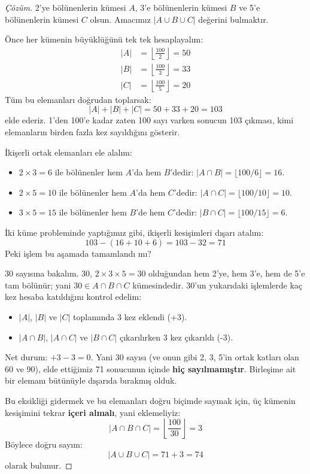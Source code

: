 \begin{proof}[Çözüm]
2'ye bölünenlerin kümesi $A$, 3'e bölünenlerin kümesi $B$ ve 5'e bölünenlerin kümesi
$C$ olsun. Amacımız $|A \cup B \cup C|$ değerini bulmaktır.

Önce her kümenin büyüklüğünü tek tek hesaplayalım: \begin{align*} |A| &=
\left\lfloor \frac{100}{2} \right\rfloor = 50 \\ |B| &= \left\lfloor
\frac{100}{3} \right\rfloor = 33 \\ |C| &= \left\lfloor \frac{100}{5}
\right\rfloor = 20 \end{align*} Tüm bu elemanları doğrudan toplarsak: \[ |A| +
|B| + |C| = 50 + 33 + 20 = 103 \] elde ederiz. 1'den 100'e kadar zaten 100 sayı
varken sonucun 103 çıkması, kimi elemanların birden fazla kez sayıldığını gösterir.

İkişerli ortak elemanları ele alalım: \begin{itemize} \item $2 \times 3 = 6$ ile
bölünenler hem $A$'da hem $B$'dedir: $|A \cap B| = \lfloor 100/6 \rfloor = 16$. \item
$2 \times 5 = 10$ ile bölünenler hem $A$'da hem $C$'dedir:
$|A \cap C| = \lfloor 100/10 \rfloor = 10$. \item $3 \times 5 = 15$ ile bölünenler
hem $B$'de hem $C$'dedir: $|B \cap C| = \lfloor 100/15 \rfloor = 6$. \end{itemize} İki
küme probleminde yaptığımız gibi, ikişerli kesişimleri dışarı atalım: \[ 103 -
(16 + 10 + 6) = 103 - 32 = 71 \] Peki işlem bu aşamada tamamlandı mı?

30 sayısına bakalım. 30, $2 \times 3 \times 5 = 30$ olduğundan hem 2'ye, hem
3'e, hem de 5'e tam bölünür; yani $30 \in A \cap B \cap C$ kümesindedir. 30'un
yukarıdaki işlemlerde kaç kez hesaba katıldığını kontrol edelim:
\begin{itemize} \item $|A|$, $|B|$ ve $|C|$ toplamında 3 kez eklendi (+3). \item
$|A \cap B|$, $|A \cap C|$ ve $|B \cap C|$ çıkarılırken 3 kez çıkarıldı (-3).
\end{itemize} Net durum: $+3 - 3 = 0$. Yani 30 sayısı (ve onun gibi 2, 3, 5'in ortak
katları olan 60 ve 90), elde ettiğimiz 71 sonucunun içinde \textbf{hiç
sayılmamıştır}. Birleşime ait bir elemanı bütünüyle dışarıda bırakmış olduk.

Bu eksikliği gidermek ve bu elemanları doğru biçimde saymak için, üç kümenin
kesişimini tekrar \textbf{içeri almalı}, yani eklemeliyiz: \[ |A \cap B \cap C| =
\left\lfloor \frac{100}{30} \right\rfloor = 3 \] Böylece doğru sayım: \[ |A \cup B
\cup C| = 71 + 3 = 74 \] olarak bulunur. \end{proof}

